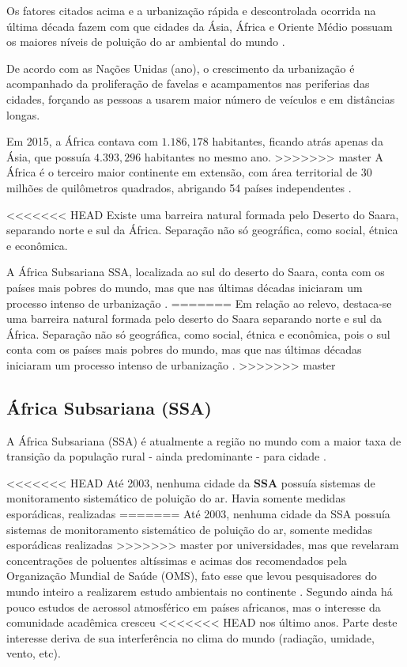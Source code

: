 Os fatores citados acima e a urbanização rápida e descontrolada ocorrida na
última década fazem com que cidades da Ásia, África e Oriente 
Médio possuam os maiores níveis de poluição do ar ambiental do mundo 
\citep{brauer2012}.

De acordo com as Nações Unidas (ano), o crescimento da urbanização é acompanhado 
da proliferação de favelas e acampamentos nas periferias das cidades, forçando
as pessoas a usarem maior número de veículos e em distâncias longas.  

Em 2015, a África contava com $1.186,178$ habitantes, ficando atrás 
apenas da Ásia, que possuía $4.393,296$ habitantes no mesmo ano. 
>>>>>>> master
A África é o terceiro maior continente em extensão, com área territorial 
de 30 milhões de quilômetros quadrados, abrigando 54 países independentes 
\citep{UN}.

<<<<<<< HEAD
Existe uma barreira natural formada pelo Deserto do Saara,
separando norte e sul da África. Separação não só geográfica, como
social, étnica e econômica. 

A África Subsariana SSA, localizada ao sul do deserto do Saara, conta com os 
países mais pobres do mundo, mas que 
nas últimas décadas iniciaram um processo intenso de urbanização \citep{UN}. 
=======
Em relação ao relevo, destaca-se uma barreira natural formada pelo deserto do 
Saara separando norte e sul da África. Separação não só geográfica, como
social, étnica e econômica, pois o sul conta com os países mais pobres do mundo, 
mas que nas últimas décadas iniciaram um processo intenso de urbanização 
\citep{UN}. 
>>>>>>> master
   	
\subsection{África Subsariana (SSA)}

A África Subsariana (SSA) é atualmente a região no mundo com a maior 
taxa de transição da população rural - ainda predominante - para cidade
\citep{MONTGOMERY2008}. 

<<<<<<< HEAD
Até 2003, nenhuma cidade da \textbf{SSA} possuía sistemas de monitoramento 
sistemático de poluição do ar. Havia somente medidas esporádicas, realizadas
=======
Até 2003, nenhuma cidade da SSA possuía sistemas de monitoramento 
sistemático de poluição do ar, somente medidas esporádicas realizadas
>>>>>>> master
por universidades, mas que revelaram concentrações de poluentes altíssimas e 
acimas dos recomendados pela Organização Mundial de Saúde (OMS),
fato esse que levou pesquisadores do mundo inteiro a 
realizarem estudo ambientais no continente \citep{EZZATI2004}. 
Segundo \cite{aboh2009} ainda há pouco estudos de aerossol atmosférico 
em países africanos, mas o interesse da comunidade acadêmica cresceu
<<<<<<< HEAD
nos último anos. Parte deste interesse deriva de sua interferência no clima  do mundo
(radiação, umidade, vento, etc).

